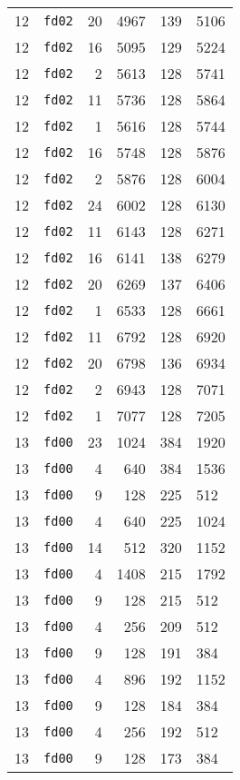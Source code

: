 \documentclass{article}
\begin{document}
\begin{table}[h!]
\begin{tabular}{llrrrl}
    12 & \texttt{fd02} & 20 & 4967 & 139 & 5106 \\
    12 & \texttt{fd02} & 16 & 5095 & 129 & 5224 \\
    12 & \texttt{fd02} & 2 & 5613 & 128 & 5741 \\
    12 & \texttt{fd02} & 11 & 5736 & 128 & 5864 \\
    12 & \texttt{fd02} & 1 & 5616 & 128 & 5744 \\
    12 & \texttt{fd02} & 16 & 5748 & 128 & 5876 \\
    12 & \texttt{fd02} & 2 & 5876 & 128 & 6004 \\
    12 & \texttt{fd02} & 24 & 6002 & 128 & 6130 \\
    12 & \texttt{fd02} & 11 & 6143 & 128 & 6271 \\
    12 & \texttt{fd02} & 16 & 6141 & 138 & 6279 \\
    12 & \texttt{fd02} & 20 & 6269 & 137 & 6406 \\
    12 & \texttt{fd02} & 1 & 6533 & 128 & 6661 \\
    12 & \texttt{fd02} & 11 & 6792 & 128 & 6920 \\
    12 & \texttt{fd02} & 20 & 6798 & 136 & 6934 \\
    12 & \texttt{fd02} & 2 & 6943 & 128 & 7071 \\
    12 & \texttt{fd02} & 1 & 7077 & 128 & 7205 \\
    13 & \texttt{fd00} & 23 & 1024 & 384 & 1920 \\
    13 & \texttt{fd00} & 4 & 640 & 384 & 1536 \\
    13 & \texttt{fd00} & 9 & 128 & 225 & 512 \\
    13 & \texttt{fd00} & 4 & 640 & 225 & 1024 \\
    13 & \texttt{fd00} & 14 & 512 & 320 & 1152 \\
    13 & \texttt{fd00} & 4 & 1408 & 215 & 1792 \\
    13 & \texttt{fd00} & 9 & 128 & 215 & 512 \\
    13 & \texttt{fd00} & 4 & 256 & 209 & 512 \\
    13 & \texttt{fd00} & 9 & 128 & 191 & 384 \\
    13 & \texttt{fd00} & 4 & 896 & 192 & 1152 \\
    13 & \texttt{fd00} & 9 & 128 & 184 & 384 \\
    13 & \texttt{fd00} & 4 & 256 & 192 & 512 \\
    13 & \texttt{fd00} & 9 & 128 & 173 & 384 \\

\end{tabular}
\end{table}
\end{document}
